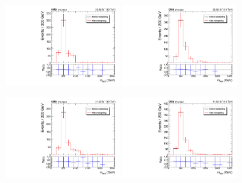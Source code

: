 \begin{figure}[htbp]
  \centering

  \includegraphics[width=0.45\textwidth]{figures/2016/Boosted_SR_Electron_WRCand_Mass.pdf}
  \hspace{0.01\textwidth}
  \includegraphics[width=0.45\textwidth]{figures/2016/Boosted_SR_Muon_WRCand_Mass.pdf}
  \vspace{0.01\textwidth}

  \includegraphics[width=0.45\textwidth]{figures/2017/Boosted_SR_Electron_WRCand_Mass.pdf}
  \hspace{0.01\textwidth}
  \includegraphics[width=0.45\textwidth]{figures/2017/Boosted_SR_Muon_WRCand_Mass.pdf}
  \vspace{0.01\textwidth}


\end{figure}
